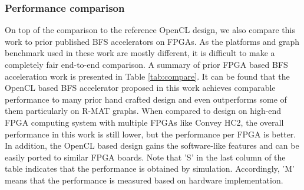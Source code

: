 \subsubsection{Performance comparison}
On top of the comparison to the reference OpenCL design, we also compare 
this work to prior published BFS accelerators on FPGAs. As the platforms 
and graph benchmark used in these work are mostly different, it is 
difficult to make a completely fair end-to-end comparison. 
A summary of prior FPGA based BFS acceleration work is presented in Table \ref{tab:compare}. 
It can be found that the OpenCL based BFS accelerator proposed in this work achieves 
comparable performance to many prior hand crafted design and even outperforms some of them 
particularly on R-MAT graphs. When compared to design on high-end 
FPGA computing system with multiple FPGAs like Convey HC2\cite{attia2014cygraph}, 
the overall performance in this work is still lower, 
but the performance per FPGA is better. In addition, the OpenCL based design 
gains the software-like features and can be easily ported to similar FPGA boards.
Note that 'S' in the last column of the table indicates that the performance is obtained by simulation. 
Accordingly, 'M' means that the performance is measured based on hardware implementation. 

